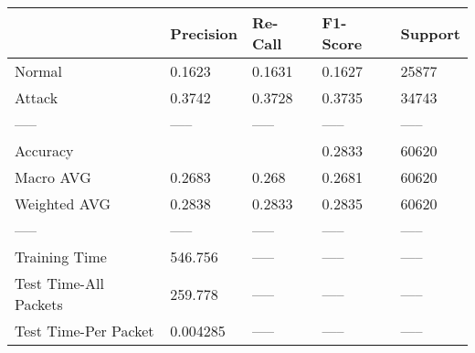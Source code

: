 \begin{tabular}{lllll}
\toprule
{} & Precision & Re-Call & F1-Score & Support \\
\midrule
Normal                &    0.1623 &  0.1631 &   0.1627 &   25877 \\
Attack                &    0.3742 &  0.3728 &   0.3735 &   34743 \\
-----                 &     ----- &   ----- &    ----- &   ----- \\
Accuracy              &           &         &   0.2833 &   60620 \\
Macro AVG             &    0.2683 &   0.268 &   0.2681 &   60620 \\
Weighted AVG          &    0.2838 &  0.2833 &   0.2835 &   60620 \\
-----                 &     ----- &   ----- &    ----- &   ----- \\
Training Time         &   546.756 &   ----- &    ----- &   ----- \\
Test Time-All Packets &   259.778 &   ----- &    ----- &   ----- \\
Test Time-Per Packet  &  0.004285 &   ----- &    ----- &   ----- \\
\bottomrule
\end{tabular}
